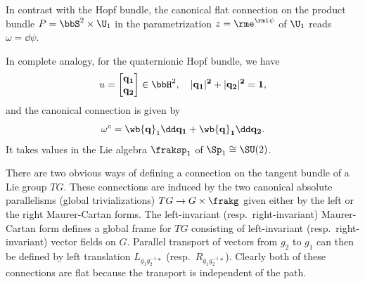 \begin{example}
    In contrast with the Hopf bundle, the canonical flat connection on the product bundle $P=\bbS^2\times\U_1$ in the parametrization $z=\rme^{\rmi \psi}$ of $\U_1$ reads $\omega=\dd\psi$.

    In complete analogy, for the quaternionic Hopf bundle, we have
    \[u=\begin{bmatrix}
        \bf{q}_1\\\bf{q}_2
    \end{bmatrix}
    \in\bbH^2, \quad |\bf{q}_1|^2 +|\bf{q}_2|^2=1,\]
    and the canonical connection is given by
    \[\omega^c=\wb{\bf{q}}_1\dd\bf{q}_1+\wb{\bf{q}}_1\dd \bf{q}_2.\]
    It takes values in the Lie algebra $\fraksp_1$ of $\Sp_1\cong \SU(2)$.

\end{example}


\begin{example}\label{ex connections on G, part 1}
    There are two obvious ways of defining a connection on the tangent bundle of a Lie group $TG$. These connections are induced by the two canonical absolute parallelisms (global trivializations) $TG\to G\times\frakg$ given either by the left or the right Maurer-Cartan forms. The left-invariant (resp.\ right-invariant) Maurer-Cartan form defines a global frame for $TG$ consisting of left-invariant (resp.\ right-invariant) vector fields on $G$. Parallel transport of vectors from $g_2$ to $g_1$ can then be defined by left translation $L_{g_1g_2^{-1}\ast}$ (resp.\ $R_{g_1g_2^{-1}\ast}$). Clearly both of these connections are flat because the transport is independent of the path.


\end{example}
